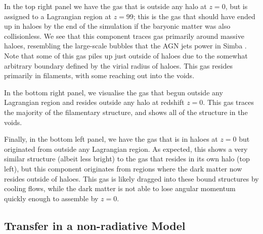 \documentclass[fleqn,usenatbib]{mnras}
\newcommand{\simba}{{\sc Simba}}
\begin{document}
In the top right panel we have the gas that is outside any halo at $z=0$, but
is assigned to a Lagrangian region at $z=99$; this is the gas that should
have ended up in haloes by the end of the simulation if the baryonic matter
was also collisionless. We see that this component traces gas primarily
around massive haloes, resembling the large-scale bubbles that the AGN jets
power in \simba{} \citep{Dave2019}. Note that some of this gas piles up just
outside of haloes due to the somewhat arbitrary boundary defined by the
virial radius of haloes. This gas resides primarily in filaments, with some
reaching out into the voids.

In the bottom right panel, we visualise the gas that begun outside any
Lagrangian region and resides outside any halo at redshift $z=0$. This gas
traces the majority of the filamentary structure, and shows all of the
structure in the voids. 

Finally, in the bottom left panel, we have the gas that is in haloes at $z=0$
but originated from outside any Lagrangian region. As expected, this shows a
very similar structure (albeit less bright) to the gas that resides in its
own halo (top left), but this component originates from regions where the
dark matter now resides outside of haloes. This gas is likely dragged into
these bound structures by cooling flows, while the dark matter
is not able to lose angular momentum quickly enough to assemble by $z=0$.




\subsection{Transfer in a non-radiative Model}
\end{document}
